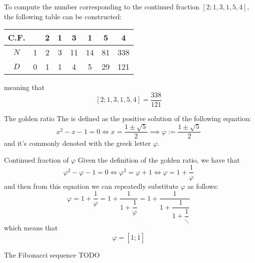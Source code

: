 \documentclass[a4paper, 12pt]{report}
\begin{document}
    \begin{example}
        To compute the number corresponding to the continued fraction $[2;1,3,1,5,4]$, the following table can be constructed:

        \begin{center}
            \begin{tabular}{c|c|c|c|c|c|c|c} 
                C.F. & & 2 & 1 & 3 & 1 & 5 & 4 \\
                \hline
                $N$ & 1 & 2 & 3 & 11 & 14 & 81 & 338 \\
                \hline
                $D$ & 0 & 1 & 1 & 4 & 5 & 29 & 121 \\
                \hline
            \end{tabular}
        \end{center}

        meaning that $$[2;1,3,1,5,4] = \dfrac{338}{121}$$
    \end{example}

    \begin{frameddefn}{The golden ratio}
        The  is defined as the positive solution of the following equation: $$x ^2 - x - 1 = 0 \iff x = \dfrac{1 \pm \sqrt{5}}{2} \implies \varphi := \dfrac{1 \pm \sqrt{5}}{2}$$ and it's commonly denoted with the greek letter $\varphi$.
    \end{frameddefn}

    \begin{framedobs}[label={golden ratio cont frac}]{Continued fraction of $\varphi$}
        Given the definition of the golden ratio, we have that $$\varphi ^2 - \varphi - 1 = 0 \iff \varphi^2 = \varphi + 1 \iff  \varphi = 1 + \dfrac{1}{\varphi}$$ and then from this equation we can repeatedly substitute $\varphi$ as follows: $$\varphi = 1 + \dfrac{1}{\varphi} = 1 + \dfrac{1}{1 + \dfrac{1}{\varphi}} = 1 + \dfrac{1}{1 + \dfrac{1}{1 + \dfrac{1}{\ddots}}}$$ which means that $$\varphi = [1; \overline 1]$$
    \end{framedobs}

    \begin{frameddefn}[label={fib def}]{The Fibonacci sequence}
        TODO
    \end{frameddefn}
\end{document}
